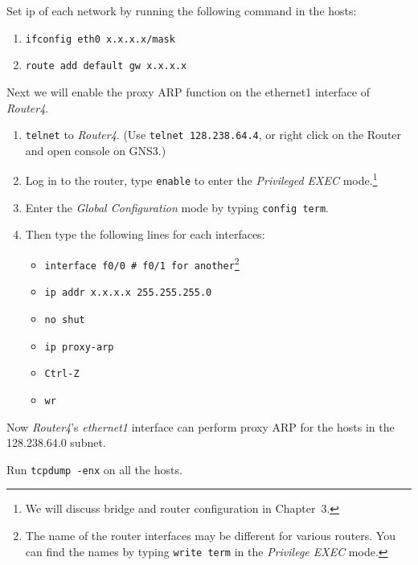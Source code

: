 \documentclass{../UTNetLab}
\begin{document}
    Set ip of each network by running the following command in the hosts:
    \begin{enumerate}
        \item \lstinline[emph={x.x.x.x}]{ifconfig eth0 x.x.x.x/mask}
        \item \lstinline[emph={x.x.x.x}]{route add default gw x.x.x.x}
    \end{enumerate}
    Next we will enable the proxy ARP function on the ethernet1 interface of \textit{Router4}.
    \begin{enumerate}
        \item \lstinline{telnet} to \textit{Router4}. (Use \lstinline{telnet 128.238.64.4}, or right click on the Router and open console on GNS3.)
        \item Log in to the router, type \lstinline[language={cisco}]{enable} to enter the \textit{Privileged EXEC} mode.\footnote{We will discuss bridge and router configuration in Chapter~3.}
        \item Enter the \textit{Global Configuration} mode by typing \lstinline[language={cisco}]{config term}.
        \item Then type the following lines for each interfaces:
        \begin{itemize}
            \item \lstinline[language={cisco}]{interface f0/0 # f0/1 for another}\footnote{The name of the router interfaces may be different for various routers.
            You can find the names by typing \lstinline[language={cisco}]{write term} in the \textit{Privilege EXEC} mode.}
            \item \lstinline[language={cisco}]{ip addr x.x.x.x 255.255.255.0}
            \item \lstinline[language={cisco}]{no shut}
            \item \lstinline[language={cisco}]{ip proxy-arp}
            \item \texttt{Ctrl-Z}
            \item \lstinline[language={cisco}]{wr}
        \end{itemize}
    \end{enumerate}
    
    Now \textit{Router4}’s \textit{ethernet1} interface can perform proxy ARP for the hosts in the 128.238.64.0 subnet.

    Run \lstinline{tcpdump -enx} on all the hosts.
\end{document}
